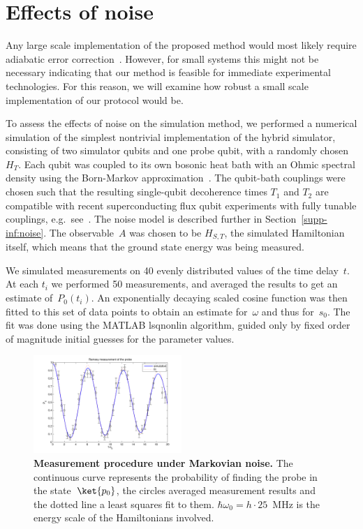 \documentclass[11pt,oneside,final]{huthesis}%
\begin{document}
\section{Effects of noise}
\label{sec:noise}

Any large scale implementation of the proposed method would most likely require
adiabatic error correction~\cite{Jordan06,Lidar08,Amin09C}.
However, for small systems this might not be necessary indicating that our
method is feasible for immediate experimental technologies. For this reason, we will examine how robust a small scale implementation of our protocol would be.

To assess the effects of noise on the simulation method, we performed
a numerical simulation of the simplest nontrivial implementation of the
hybrid simulator, consisting of two simulator qubits and one probe
qubit, with a randomly chosen~$H_T$.
Each qubit was coupled to its own bosonic heat bath with an Ohmic
spectral density using the Born-Markov approximation~\cite{Breuer02}.
The qubit-bath couplings were chosen such that the resulting single-qubit
decoherence times $T_1$ and $T_2$ are compatible with
recent superconducting flux qubit experiments with fully tunable
couplings, e.g.~see~\cite{Niskanen07}.
The noise model is described further in Section~\ref{supp-inf:noise}.
The observable~$A$ was chosen to be $H_{S,T}$, the simulated
Hamiltonian itself, which means that the ground state energy was being
measured.

We simulated measurements on 40 evenly distributed values of the time
delay~$t$. At each $t_i$ we performed 50 measurements, and averaged
the results to get an estimate of~$P_0(t_i)$.
An exponentially decaying scaled cosine function was then fitted to
this set of data points to obtain an estimate for~$\omega$ and thus for~$s_0$.
The fit was done using the MATLAB {\sc lsqnonlin} algorithm, guided
only by fixed order of magnitude initial guesses for the parameter values.
\begin{figure}[h]
\begin{center}
\includegraphics[width=0.5\textwidth]{./figures/new_ramsey}
\caption{\textbf{Measurement procedure under Markovian noise.}
The continuous curve represents the probability of finding
the probe in the state~$\ket{p_0}$, the circles
averaged measurement results and the dotted line a least squares fit to them.
$\hbar \omega_0 = h \cdot 25$~MHz is the energy scale of the Hamiltonians involved.
}
\label{fig:noise}
\end{center}
\end{figure}
\end{document}
